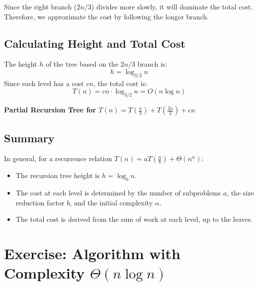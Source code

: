 Since the right branch (\(2n/3\)) divides more slowly, it will dominate the total cost. Therefore, we approximate the cost by following the longer branch.

\subsection{Calculating Height and Total Cost}

The height \(h\) of the tree based on the \(2n/3\) branch is:
\[
h = \log_{3/2} n
\]
Since each level has a cost \(cn\), the total cost is:
\[
T(n) = cn \cdot \log_{3/2} n = O(n \log n)
\]

\begin{center}
    \textbf{Partial Recursion Tree for \(T(n) = T\left(\frac{n}{3}\right) + T\left(\frac{2n}{3}\right) + cn\)}


\end{center}
\subsection{Summary}

In general, for a recurrence relation \( T(n) = a T\left(\frac{n}{b}\right) + \Theta(n^\alpha) \):
\begin{itemize}
    \item The recursion tree height is \( h = \log_b n \).
    \item The cost at each level is determined by the number of subproblems \(a\), the size reduction factor \(b\), and the initial complexity \(\alpha\).
    \item The total cost is derived from the sum of work at each level, up to the leaves.
\end{itemize}

\section{Exercise: Algorithm with Complexity \(\Theta(n \log n)\)}

